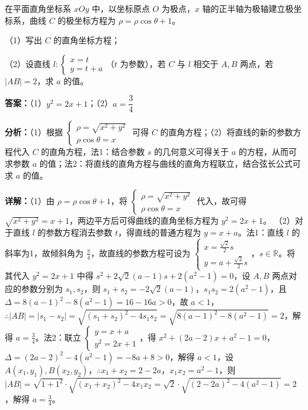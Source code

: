 \begin{question}[points=10]
[选修4-4：坐标系与参数方程]

在平面直角坐标系 $xOy$ 中，以坐标原点 $O$ 为极点，$x$ 轴的正半轴为极轴建立极坐标系，曲线 $C$ 的极坐标方程为 $\rho=\rho\cos\theta+1$。

（1）写出 $C$ 的直角坐标方程；

（2）设直线 $l:\begin{cases} x=t \\ y=t+a \end{cases}$（$t$ 为参数），若 $C$ 与 $l$ 相交于 $A,B$ 两点，若 $|AB|=2$，求 $a$ 的值。
\begin{solution}
\textbf{答案：}（1）$y^2=2x+1$；（2）$a=\dfrac{3}{4}$

\textbf{分析：}（1）根据 $\begin{cases} \rho=\sqrt{x^2+y^2} \\ \rho\cos\theta=x \end{cases}$ 可得 $C$ 的直角方程；（2）将直线的新的参数方程代入 $C$ 的直角方程，法1：结合参数 $s$ 的几何意义可得关于 $a$ 的方程，从而可求参数 $a$ 的值；法2：将直线的直角方程与曲线的直角方程联立，结合弦长公式可求 $a$ 的值。

\textbf{详解：}（1）由 $\rho=\rho\cos\theta+1$，将 $\begin{cases} \rho=\sqrt{x^2+y^2} \\ \rho\cos\theta=x \end{cases}$ 代入，故可得 $\sqrt{x^2+y^2}=x+1$，两边平方后可得曲线的直角坐标方程为 $y^2=2x+1$。
（2）对于直线 $l$ 的参数方程消去参数 $t$，得直线的普通方程为 $y=x+a$。法1：直线 $l$ 的斜率为1，故倾斜角为 $\frac{\pi}{4}$，故直线的参数方程可设为 $\begin{cases} x=\frac{\sqrt{2}}{2}s \\ y=a+\frac{\sqrt{2}}{2}s \end{cases}$，$s\in\mathbb{R}$。将其代入 $y^2=2x+1$ 中得 $s^2+2\sqrt{2}(a-1)s+2(a^2-1)=0$，设 $A,B$ 两点对应的参数分别为 $s_1,s_2$，则 $s_1+s_2=-2\sqrt{2}(a-1)$，$s_1s_2=2(a^2-1)$，且 $\Delta=8(a-1)^2-8(a^2-1)=16-16a>0$，故 $a<1$，$\therefore |AB|=|s_1-s_2|=\sqrt{(s_1+s_2)^2-4s_1s_2}=\sqrt{8(a-1)^2-8(a^2-1)}=2$，解得 $a=\frac{3}{4}$。法2：联立 $\begin{cases} y=x+a \\ y^2=2x+1 \end{cases}$，得 $x^2+(2a-2)x+a^2-1=0$，$\Delta=(2a-2)^2-4(a^2-1)=-8a+8>0$，解得 $a<1$，设 $A(x_1,y_1),B(x_2,y_2)$，$\therefore x_1+x_2=2-2a$，$x_1x_2=a^2-1$，则 $|AB|=\sqrt{1+1^2}\cdot\sqrt{(x_1+x_2)^2-4x_1x_2}=\sqrt{2}\cdot\sqrt{(2-2a)^2-4(a^2-1)}=2$，解得 $a=\frac{3}{4}$。
\end{solution}
\end{question}

